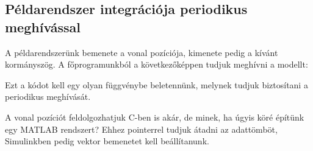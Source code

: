 \subsection{Példarendszer integrációja periodikus meghívással}

A példarendszerünk bemenete a vonal pozíciója, kimenete pedig a kívánt kormányszög. A főprogramunkból a következőképpen tudjuk meghívni a modellt:



Ezt a kódot kell egy olyan függvénybe beletennünk, melynek tudjuk biztosítani a periodikus meghívását.

A vonal pozíciót feldolgozhatjuk C-ben is akár, de minek, ha úgyis köré építünk egy MATLAB rendszert? Ehhez pointerrel tudjuk átadni az adattömböt, Simulinkben pedig vektor bemenetet kell beállítanunk.